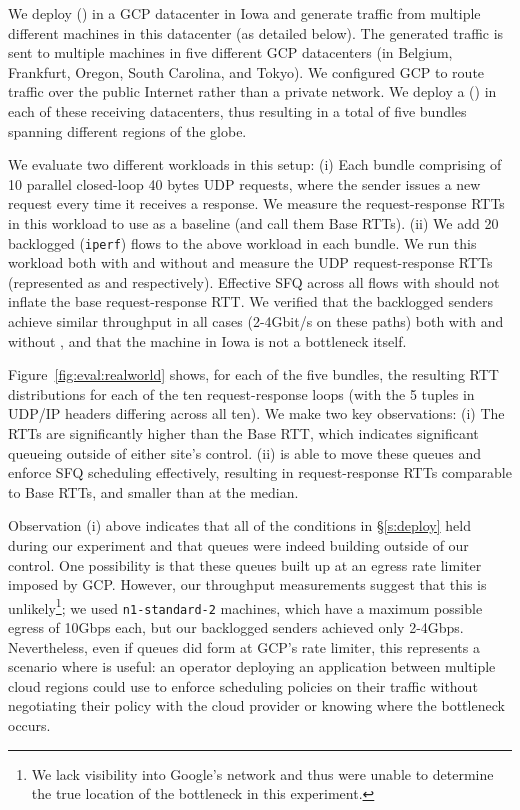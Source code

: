 We deploy \name (\inbox) in a GCP datacenter in Iowa and generate traffic from multiple different machines in this datacenter (as detailed below). 
The generated traffic is sent to multiple machines in five different GCP datacenters (in Belgium, Frankfurt, Oregon, South Carolina, and Tokyo). We configured GCP to route traffic over the public Internet rather than a private network. 
We deploy a \name (\outbox) in each of these receiving datacenters, thus resulting in a total of five bundles spanning different regions of the globe.

We evaluate two different workloads in this setup: (i) Each bundle comprising of 10 parallel closed-loop 40 bytes UDP requests, where the sender issues a new request every time it receives a response. We measure the request-response RTTs in this workload to use as a baseline (and call them Base RTTs). (ii) We add 20 backlogged (\texttt{iperf}) flows to the above workload in each bundle. We run this workload both with and without \name and measure the UDP request-response RTTs (represented as \name and \baseline respectively). Effective SFQ across all flows with \name should not inflate the base request-response RTT.
We verified that the backlogged senders achieve similar throughput in all cases (2-4Gbit/s on these paths) both with and without \name, and that the \name machine in Iowa is not a bottleneck itself. 

Figure~\ref{fig:eval:realworld} shows, for each of the five bundles, the resulting RTT distributions for each of the ten request-response loops (with the 5 tuples in UDP/IP headers differing across all ten). 
We make two key observations: (i) The \baseline RTTs are significantly higher than the Base RTT, which indicates significant queueing outside of either site's control. (ii) \name is able to move these queues and enforce SFQ scheduling effectively, resulting in request-response RTTs comparable to Base RTTs, and \realworldMedianLatencyImprovement smaller than \baseline at the median.

Observation (i) above indicates that all of the conditions in \S\ref{s:deploy} held during our experiment and that queues were indeed building outside of our control. 
One possibility is that these queues built up at an egress rate limiter imposed by GCP. 
However, our throughput measurements suggest that this is unlikely\footnote{We lack visibility into Google's network and thus were unable to determine the true location of the bottleneck in this experiment.}; we used \texttt{n1-standard-2} machines, which have a maximum possible egress of 10Gbps each, but our backlogged senders achieved only 2-4Gbps. 
Nevertheless, even if queues did form at GCP's rate limiter, this represents a scenario where \name is useful: 
an operator deploying an application between multiple cloud regions could use \name to enforce scheduling policies on their traffic without negotiating their policy with the cloud provider or knowing where the bottleneck occurs. 
